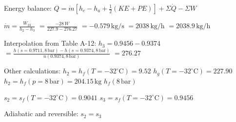 Energy balance:  
\( Q = \dot{m} \left[ h_c - h_a + \frac{1}{2} (KE + PE) \right] + \Sigma \dot{Q} - \Sigma W \)  

\( \dot{m} = \frac{W_{23}}{h_2 - h_3} \)  
\( = \frac{-28 \, W}{227.9 - 276.27} \)  
\( = -0.579 \, \text{kg/s} \)  
\( = 2038 \, \text{kg/h} \)  
\( = 2038.9 \, \text{kg/h} \)  

Interpolation from Table A-12:  
\( h_3 = 0.9456 - 0.9374 \)  
\( = \frac{h(s=0.9711, 8 \, \text{bar}) - h(s=0.9374, 8 \, \text{bar})}{n(0.9374, 8 \, \text{bar})} \)  
\( = 276.27 \)  

Other calculations:  
\( h_2 = h_f(T = -32^\circ \text{C}) = 9.52 \)  
\( h_g(T = -32^\circ \text{C}) = 227.90 \)  
\( h_2 = h_f(p = 8 \, \text{bar}) = 204.15 \, \text{kg} \)  
\( h_f(8 \, \text{bar}) \)  

\( s_2 = s_f(T = -32^\circ \text{C}) = 0.9041 \)  
\( s_3 = s_f(T = -32^\circ \text{C}) = 0.9456 \)  

Adiabatic and reversible: \( s_2 = s_3 \)